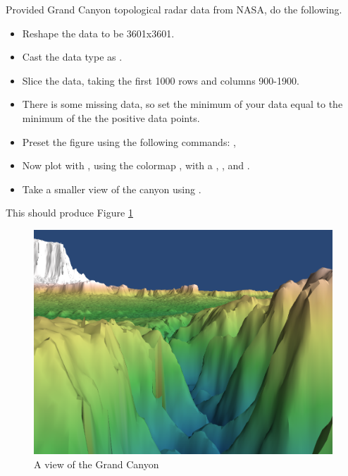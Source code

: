 \begin{problem} 
Provided Grand Canyon topological radar data from NASA, 
do the following.

\begin{itemize}
\item Reshape the data to be 3601x3601.
\item Cast the data type as . 
\item Slice the data, taking the first 1000 rows and columns 900-1900.
\item There is some missing data, so set the minimum of your data equal to the minimum of the the positive data points. 
\item Preset the figure using the following commands: , 
\item Now plot with , using the colormap , with a , , and .
\item Take a smaller view of the canyon using .
\end{itemize}

This should produce Figure \ref{fig:GrandCanyon}

\end{problem}

\begin{figure} 
\includegraphics[width=\textwidth]{GrandCanyon.png}
\caption{A view of the Grand Canyon} 
\label{fig:GrandCanyon}
\end{figure}

